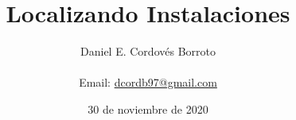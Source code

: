 \documentclass{article}
\author{Daniel E. Cordovés Borroto \\ \\ Email: \href{mailto:dcordb97@gmail.com}{dcordb97@gmail.com}}
\title{Localizando Instalaciones}
\begin{document}
    \date{30 de noviembre de 2020}
	\maketitle
	\newpage
	\tableofcontents

    
    
    
    
	
\end{document}
